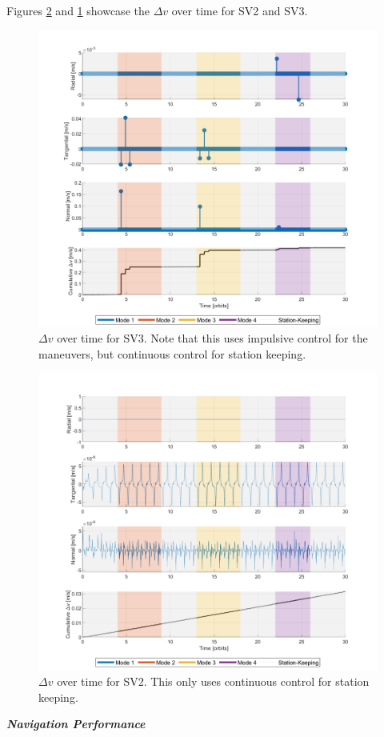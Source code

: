 Figures \ref{fig:delta_v_cumulative_sv2} and \ref{fig:delta_v_cumulative_sv3} showcase the $\Delta v$ over time for SV2 and SV3.  
\begin{figure}[H]
    \centering
    \includegraphics[width=0.7\linewidth]{sim/figures/PS9/delta_v_cumulative_timeline_modes_SV3.png}
    \caption{$\Delta v$ over time for SV3. Note that this uses impulsive control for the maneuvers, but continuous control for station keeping.}
    \label{fig:delta_v_cumulative_sv3}
\end{figure}

\begin{figure}[H]
    \centering
    \includegraphics[width=0.7\linewidth]{sim/figures/PS9/delta_v_cumulative_timeline_modes_SV2.png}
    \caption{$\Delta v$ over time for SV2. This only uses continuous control for station keeping.}
    \label{fig:delta_v_cumulative_sv2}
\end{figure}

\textbf{\textit{Navigation Performance}}

